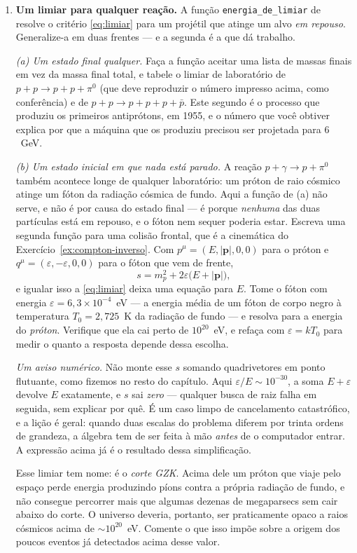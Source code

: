 \documentclass[12pt,a4paper,oneside]{book}
\theoremstyle{rgplain}
\theoremstyle{rgremark}
\begin{document}
\begin{enumerate}
  \item \textbf{Um limiar para qualquer reação.} A função
\texttt{energia\_de\_limiar} de  resolve o
critério \eqref{eq:limiar} para um projétil que atinge um alvo \emph{em
repouso}. Generalize-a em duas frentes --- e a segunda é a que dá trabalho.

  \emph{(a) Um estado final qualquer.} Faça a função aceitar uma lista de
massas finais em vez da massa final total, e tabele o limiar de laboratório de
$p+p\to p+p+\pi^0$ (que deve reproduzir o número impresso acima, como
conferência) e de $p+p\to p+p+p+\bar p$. Este segundo é o processo que produziu
os primeiros antiprótons, em 1955, e o número que você obtiver explica por que
a máquina que os produziu precisou ser projetada para $6$~GeV.

  \emph{(b) Um estado inicial em que nada está parado.} A reação
$p+\gamma\to p+\pi^0$ também acontece longe de qualquer laboratório: um próton
de raio cósmico atinge um fóton da radiação cósmica de fundo. Aqui a função de
(a) não serve, e não é por causa do estado final --- é porque \emph{nenhuma}
das duas partículas está em repouso, e o fóton nem sequer poderia estar. Escreva
uma segunda função para uma colisão frontal, que é a cinemática do
Exercício~\ref{ex:compton-inverso}. Com $p^\mu=(E,|\bm p|,0,0)$ para o próton e
$q^\mu=(\varepsilon,-\varepsilon,0,0)$ para o fóton que vem de frente,
\[
  s=m_p^2+2\varepsilon\bigl(E+|\bm p|\bigr),
\]
e igualar isso a \eqref{eq:limiar} deixa uma equação para $E$. Tome o fóton com
energia $\varepsilon=6{,}3\times10^{-4}$~eV --- a energia média de um fóton de
corpo negro à temperatura $T_0=2{,}725$~K da radiação de fundo --- e resolva
para a energia do \emph{próton}. Verifique que ela cai perto de $10^{20}$~eV, e
refaça com $\varepsilon=kT_0$ para medir o quanto a resposta depende dessa
escolha.

  \emph{Um aviso numérico.} Não monte esse $s$ somando
quadrivetores em ponto flutuante, como fizemos no resto do capítulo. Aqui
$\varepsilon/E\sim10^{-30}$, a soma $E+\varepsilon$ devolve $E$ exatamente, e
$s$ sai \emph{zero} --- qualquer busca de raiz falha em seguida, sem explicar
por quê. É um caso limpo de cancelamento catastrófico, e a lição é geral:
quando duas escalas do problema diferem por trinta ordens de grandeza, a
álgebra tem de ser feita à mão \emph{antes} de o computador entrar. A expressão
acima já é o resultado dessa simplificação.

  Esse limiar tem nome: é o \emph{corte GZK}. Acima dele um próton que viaje
pelo espaço perde energia produzindo píons contra a própria radiação de fundo,
e não consegue percorrer mais que algumas dezenas de megaparsecs sem cair
abaixo do corte. O universo deveria, portanto, ser praticamente opaco a raios
cósmicos acima de $\sim10^{20}$~eV. Comente o que isso impõe sobre a origem dos
poucos eventos já detectados acima desse valor.


\end{enumerate}
\end{document}
